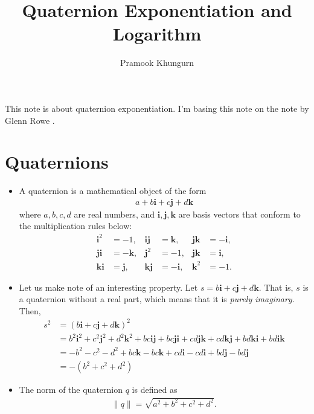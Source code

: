 \documentclass[10pt]{article}
\title{Quaternion Exponentiation and Logarithm}
\author{Pramook Khungurn}
\newcommand{\ve}[1]{\mathbf{#1}}
\begin{document}
\maketitle

This note is about quaternion exponentiation. I'm basing this note on the note by Glenn Rowe \cite{Rowe:2025}.

\section{Quaternions}

\begin{itemize}
    \item A quaternion is a mathematical object of the form
    \begin{align*}
        a + b\ve{i} + c\ve{j} + d\ve{k}
    \end{align*}
    where $a, b, c, d$ are real numbers, and $\ve{i}, \ve{j}, \ve{k}$ are basis vectors that conform to the multiplication rules below:
    \begin{align*}
        \ve{i}^2 &= -1, & \ve{i}\ve{j} &= \ve{k}, & \ve{j}\ve{k} &= -\ve{i}, \\ 
        \ve{j}\ve{i} &= -\ve{k}, & \ve{j}^2 &= -1, & \ve{j}\ve{k} &= \ve{i}, \\
        \ve{k}\ve{i} &= \ve{j}, & \ve{k}\ve{j} &= -\ve{i}, & \ve{k}^2 &= -1.
    \end{align*}

    \item Let us make note of an interesting property. Let $s = b\ve{i} + c\ve{j} + d\ve{k}$. That is, $s$ is a quaternion without a real part, which means that it is \emph{purely imaginary}. Then,
    \begin{align*}
        s^2 
        &= (b\ve{i} + c\ve{j} + d\ve{k})^2\\
        &= b^2\ve{i}^2 + c^2\ve{j}^2 + d^2\ve{k}^2 + bc\ve{i}\ve{j} + bc\ve{j}\ve{i} + cd\ve{j}\ve{k} + cd\ve{k}\ve{j} + bd\ve{k}\ve{i} + bd\ve{i}\ve{k} \\
        &= -b^2 -c^2 -d^2 + bc\ve{k} - bc\ve{k} + cd\ve{i} - cd\ve{i} + bd\ve{j} - bd\ve{j} \\
        &= -(b^2 + c^2 + d^2)
    \end{align*}

    \item The norm of the quaternion $q$ is defined as
    \begin{align*}
        \|q\| = \sqrt{a^2 + b^2 + c^2 + d^2}.
    \end{align*}


\end{itemize}
\end{document}
